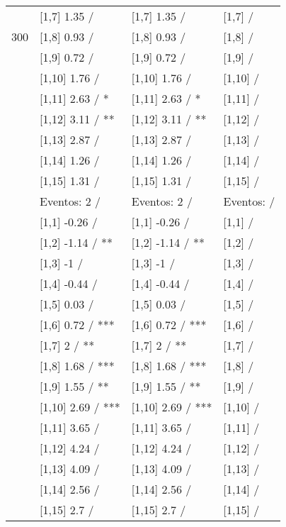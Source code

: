 \begin{table}
\begin{tabular}[t]{llll}
 & {}[1,7] 1.35  / & {}[1,7] 1.35  / & {}[1,7]  /\\
300 & {}[1,8] 0.93  / & {}[1,8] 0.93  / & {}[1,8]  /\\
\addlinespace
 & {}[1,9] 0.72  / & {}[1,9] 0.72  / & {}[1,9]  /\\
 & {}[1,10] 1.76  / & {}[1,10] 1.76  / & {}[1,10]  /\\
 & {}[1,11] 2.63  / * & {}[1,11] 2.63  / * & {}[1,11]  /\\
 & {}[1,12] 3.11  / ** & {}[1,12] 3.11  / ** & {}[1,12]  /\\
 & {}[1,13] 2.87  / & {}[1,13] 2.87  / & {}[1,13]  /\\
\addlinespace
 & {}[1,14] 1.26  / & {}[1,14] 1.26  / & {}[1,14]  /\\
 & {}[1,15] 1.31  / & {}[1,15] 1.31  / & {}[1,15]  /\\
 & Eventos:  2 / & Eventos:  2 / & Eventos:   /\\
 & {}[1,1] -0.26  / & {}[1,1] -0.26  / & {}[1,1]  /\\
 & {}[1,2] -1.14  / ** & {}[1,2] -1.14  / ** & {}[1,2]  /\\
\addlinespace
 & {}[1,3] -1  / & {}[1,3] -1  / & {}[1,3]  /\\
 & {}[1,4] -0.44  / & {}[1,4] -0.44  / & {}[1,4]  /\\
 & {}[1,5] 0.03  / & {}[1,5] 0.03  / & {}[1,5]  /\\
 & {}[1,6] 0.72  / *** & {}[1,6] 0.72  / *** & {}[1,6]  /\\
 & {}[1,7] 2  / ** & {}[1,7] 2  / ** & {}[1,7]  /\\
\addlinespace
500 & {}[1,8] 1.68  / *** & {}[1,8] 1.68  / *** & {}[1,8]  /\\
 & {}[1,9] 1.55  / ** & {}[1,9] 1.55  / ** & {}[1,9]  /\\
 & {}[1,10] 2.69  / *** & {}[1,10] 2.69  / *** & {}[1,10]  /\\
 & {}[1,11] 3.65  / & {}[1,11] 3.65  / & {}[1,11]  /\\
 & {}[1,12] 4.24  / & {}[1,12] 4.24  / & {}[1,12]  /\\
\addlinespace
 & {}[1,13] 4.09  / & {}[1,13] 4.09  / & {}[1,13]  /\\
 & {}[1,14] 2.56  / & {}[1,14] 2.56  / & {}[1,14]  /\\
 & {}[1,15] 2.7  / & {}[1,15] 2.7  / & {}[1,15]  /\\
\bottomrule
\end{tabular}
\end{table}
